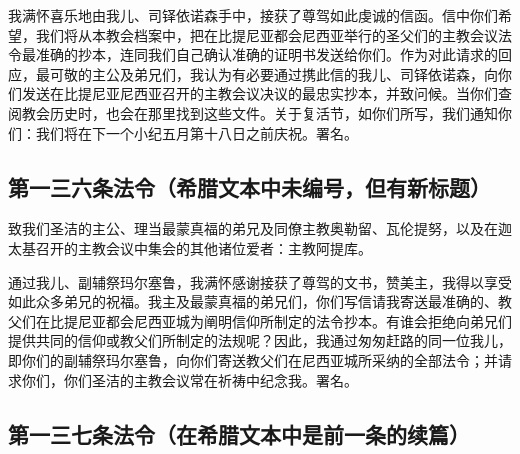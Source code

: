 我满怀喜乐地由我儿、司铎依诺森手中，接获了尊驾如此虔诚的信函。信中你们希望，我们将从本教会档案中，把在比提尼亚都会尼西亚举行的圣父们的主教会议法令最准确的抄本，连同我们自己确认准确的证明书发送给你们。作为对此请求的回应，最可敬的主公及弟兄们，我认为有必要通过携此信的我儿、司铎依诺森，向你们发送在比提尼亚尼西亚召开的主教会议决议的最忠实抄本，并致问候。当你们查阅教会历史时，也会在那里找到这些文件。关于复活节，如你们所写，我们通知你们：我们将在下一个小纪五月第十八日之前庆祝。署名。\par


\subsection{第一三六条法令（希腊文本中未编号，但有新标题）}

\par

致我们圣洁的主公、理当最蒙真福的弟兄及同僚主教奥勒留、瓦伦提努，以及在迦太基召开的主教会议中集会的其他诸位爱者：主教阿提库。\par

通过我儿、副辅祭玛尔塞鲁，我满怀感谢接获了尊驾的文书，赞美主，我得以享受如此众多弟兄的祝福。我主及最蒙真福的弟兄们，你们写信请我寄送最准确的、教父们在比提尼亚都会尼西亚城为阐明信仰所制定的法令抄本。有谁会拒绝向弟兄们提供共同的信仰或教父们所制定的法规呢？因此，我通过匆匆赶路的同一位我儿，即你们的副辅祭玛尔塞鲁，向你们寄送教父们在尼西亚城所采纳的全部法令；并请求你们，你们圣洁的主教会议常在祈祷中纪念我。署名。\par


\subsection{第一三七条法令（在希腊文本中是前一条的续篇）}

\par

\par

